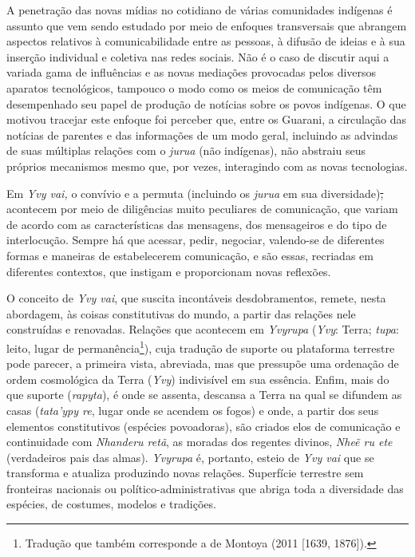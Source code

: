 A penetração das novas mídias no cotidiano de várias comunidades
indígenas é assunto que vem sendo estudado por meio de enfoques
transversais que abrangem aspectos relativos à comunicabilidade entre as
pessoas, à difusão de ideias e à sua inserção individual e coletiva nas
redes sociais. Não é o caso de discutir aqui a variada gama de
influências e as novas mediações provocadas pelos diversos aparatos
tecnológicos, tampouco o modo como os meios de comunicação têm
desempenhado seu papel de produção de notícias sobre os povos indígenas.
O que motivou tracejar este enfoque foi perceber que, entre os Guarani,
a circulação das notícias de parentes e das informações de um modo
geral, incluindo as advindas de suas múltiplas relações com o
\emph{jurua} (não indígenas), não abstraiu seus próprios mecanismos
mesmo que, por vezes, interagindo com as novas tecnologias.

Em \emph{Yvy vai,} o convívio e a permuta (incluindo os \emph{jurua} em
sua diversidade)\sout{,} acontecem por meio de diligências muito
peculiares de comunicação, que variam de acordo com as características
das mensagens, dos mensageiros e do tipo de interlocução. Sempre há que
acessar, pedir, negociar, valendo-se de diferentes formas e maneiras de
estabelecerem comunicação, e são essas, recriadas em diferentes
contextos, que instigam e proporcionam novas reflexões.

O conceito de \emph{Yvy vai}, que suscita incontáveis desdobramentos,
remete, nesta abordagem, às coisas constitutivas do mundo, a partir das
relações nele construídas e renovadas. Relações que acontecem em
\emph{Yvyrupa} (\emph{Yvy}: Terra; \emph{tupa}: leito, lugar de
permanência\footnote{Tradução que também corresponde a de Montoya (2011
  {[}1639, 1876{]}).}), cuja tradução de suporte ou plataforma terrestre
pode parecer, a primeira vista, abreviada, mas que pressupõe uma
ordenação de ordem cosmológica da Terra (\emph{Yvy}) indivisível em sua
essência. Enfim, mais do que suporte (\emph{rapyta}), é onde se assenta,
descansa a Terra na qual se difundem as casas (\emph{tata'ypy re}, lugar
onde se acendem os fogos) e onde, a partir dos seus elementos
constitutivos (espécies povoadoras), são criados elos de comunicação e
continuidade com \emph{Nhanderu retã}, as moradas dos regentes divinos,
\emph{Nheẽ ru ete} (verdadeiros pais das almas). \emph{Yvyrupa} é,
portanto, esteio de \emph{Yvy vai} que se transforma e atualiza
produzindo novas relações. Superfície terrestre sem fronteiras nacionais
ou político-administrativas que abriga toda a diversidade das espécies,
de costumes, modelos e tradições.

